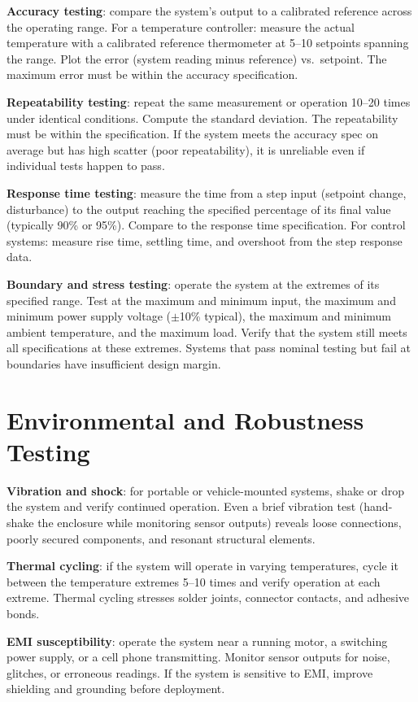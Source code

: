 \textbf{Accuracy testing}: compare the system's output to a calibrated reference across the operating range. For a temperature controller: measure the actual temperature with a calibrated reference thermometer at 5--10 setpoints spanning the range. Plot the error (system reading minus reference) vs.\ setpoint. The maximum error must be within the accuracy specification.

\textbf{Repeatability testing}: repeat the same measurement or operation 10--20 times under identical conditions. Compute the standard deviation. The repeatability must be within the specification. If the system meets the accuracy spec on average but has high scatter (poor repeatability), it is unreliable even if individual tests happen to pass.

\textbf{Response time testing}: measure the time from a step input (setpoint change, disturbance) to the output reaching the specified percentage of its final value (typically 90\% or 95\%). Compare to the response time specification. For control systems: measure rise time, settling time, and overshoot from the step response data.

\textbf{Boundary and stress testing}: operate the system at the extremes of its specified range. Test at the maximum and minimum input, the maximum and minimum power supply voltage ($\pm$10\% typical), the maximum and minimum ambient temperature, and the maximum load. Verify that the system still meets all specifications at these extremes. Systems that pass nominal testing but fail at boundaries have insufficient design margin.

\section{Environmental and Robustness Testing}
\textbf{Vibration and shock}: for portable or vehicle-mounted systems, shake or drop the system and verify continued operation. Even a brief vibration test (hand-shake the enclosure while monitoring sensor outputs) reveals loose connections, poorly secured components, and resonant structural elements.

\textbf{Thermal cycling}: if the system will operate in varying temperatures, cycle it between the temperature extremes 5--10 times and verify operation at each extreme. Thermal cycling stresses solder joints, connector contacts, and adhesive bonds.

\textbf{EMI susceptibility}: operate the system near a running motor, a switching power supply, or a cell phone transmitting. Monitor sensor outputs for noise, glitches, or erroneous readings. If the system is sensitive to EMI, improve shielding and grounding before deployment.


